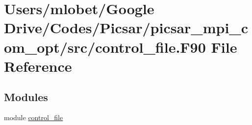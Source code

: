 \hypertarget{control__file_8_f90}{}\section{Users/mlobet/\+Google Drive/\+Codes/\+Picsar/picsar\+\_\+mpi\+\_\+com\+\_\+opt/src/control\+\_\+file.F90 File Reference}
\label{control__file_8_f90}
\subsection*{Modules}
\begin{DoxyCompactItemize}
\item 
module \hyperlink{namespacecontrol__file}{control\+\_\+file}
\end{DoxyCompactItemize}
